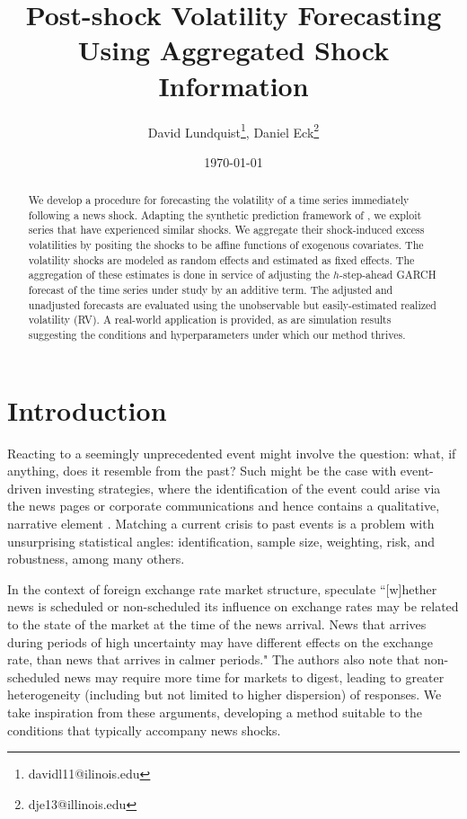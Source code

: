 \documentclass[11pt]{article}
\title{Post-shock Volatility Forecasting Using Aggregated Shock Information}
\author{David Lundquist\thanks{davidl11@ilinois.edu}, Daniel Eck\thanks{dje13@illinois.edu} }
\affil{Department of Statistics, University of Illinois at Urbana-Champaign}
\date{\today}
\theoremstyle{definition}
\begin{document}
\maketitle

\begin{abstract} 
We develop a procedure for forecasting the volatility of a time series immediately following a news shock.  Adapting the synthetic prediction framework of \citet{lin2021minimizing}, we exploit series that have experienced similar shocks.  We aggregate their shock-induced excess volatilities by positing the shocks to be affine functions of exogenous covariates.  The volatility shocks are modeled as random effects and estimated as fixed effects.  The aggregation of these estimates is done in service of adjusting the $h$-step-ahead GARCH forecast of the time series under study by an additive term.  The adjusted and unadjusted forecasts are evaluated using the unobservable but easily-estimated realized volatility (RV).  A real-world application is provided, as are simulation results suggesting the conditions and hyperparameters under which our method thrives.
\end{abstract}

\section{Introduction}

Reacting to a seemingly unprecedented event might involve the question: what, if anything, does it resemble from the past?  Such might be the case with event-driven investing strategies, where the identification of the event could arise via the news pages or corporate communications and hence contains a qualitative, narrative element \citep{Kenton}.  Matching a current crisis to past events is a problem with unsurprising statistical angles: identification, sample size, weighting, risk, and robustness, among many others.  

In the context of foreign exchange rate market structure, \citet{dominguez2006defines} speculate ``[w]hether news is scheduled or non-scheduled its influence on exchange rates may be related
to the state of the market at the time of the news arrival.  News that arrives during periods of
high uncertainty may have different effects on the exchange rate, than news that arrives in
calmer periods." The authors also note that non-scheduled news may require more time for markets to digest, leading to greater heterogeneity (including but not limited to higher dispersion) of responses.  We take inspiration from these arguments, developing a method suitable to the conditions that typically accompany news shocks. 
\end{document}
